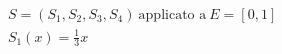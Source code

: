 \documentclass[preview]{standalone}
\begin{document}
\begin{align*}
& S = (S_1,S_2,S_3,S_4) \ \text{applicato a} \ E = [0,1] \\ & S_1(x)=\frac{1}{3}x
\end{align*}
\end{document}
